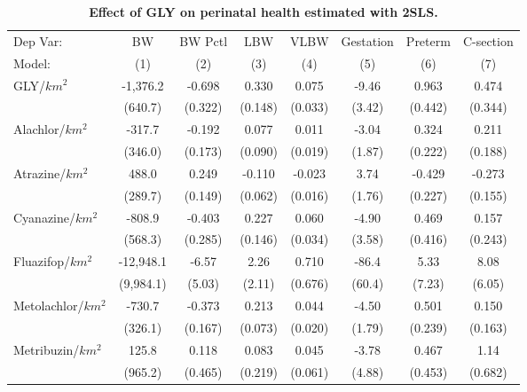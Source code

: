 \begin{table}[htbp]
   \caption{\label{tab:main-outcomes-controls} \textbf{Effect of GLY on perinatal health estimated with 2SLS.}}
   \centering
   \begin{tabular}{lccccccc}
      \toprule
      Dep Var:                  & BW         & BW Pctl & LBW     & VLBW    & Gestation & Preterm & C-section\\  
      Model:                    & (1)        & (2)     & (3)     & (4)     & (5)       & (6)     & (7)\\  
      \midrule 
      GLY/$km^2$                & -1,376.2   & -0.698  & 0.330   & 0.075   & -9.46     & 0.963   & 0.474\\   
                                & (640.7)    & (0.322) & (0.148) & (0.033) & (3.42)    & (0.442) & (0.344)\\   
      Alachlor/$km^2$           & -317.7     & -0.192  & 0.077   & 0.011   & -3.04     & 0.324   & 0.211\\   
                                & (346.0)    & (0.173) & (0.090) & (0.019) & (1.87)    & (0.222) & (0.188)\\   
      Atrazine/$km^2$           & 488.0      & 0.249   & -0.110  & -0.023  & 3.74      & -0.429  & -0.273\\   
                                & (289.7)    & (0.149) & (0.062) & (0.016) & (1.76)    & (0.227) & (0.155)\\   
      Cyanazine/$km^2$          & -808.9     & -0.403  & 0.227   & 0.060   & -4.90     & 0.469   & 0.157\\   
                                & (568.3)    & (0.285) & (0.146) & (0.034) & (3.58)    & (0.416) & (0.243)\\   
      Fluazifop/$km^2$          & -12,948.1  & -6.57   & 2.26    & 0.710   & -86.4     & 5.33    & 8.08\\   
                                & (9,984.1)  & (5.03)  & (2.11)  & (0.676) & (60.4)    & (7.23)  & (6.05)\\   
      Metolachlor/$km^2$        & -730.7     & -0.373  & 0.213   & 0.044   & -4.50     & 0.501   & 0.150\\   
                                & (326.1)    & (0.167) & (0.073) & (0.020) & (1.79)    & (0.239) & (0.163)\\   
      Metribuzin/$km^2$         & 125.8      & 0.118   & 0.083   & 0.045   & -3.78     & 0.467   & 1.14\\   
                                & (965.2)    & (0.465) & (0.219) & (0.061) & (4.88)    & (0.453) & (0.682)\\   

\end{tabular}
\end{table}
